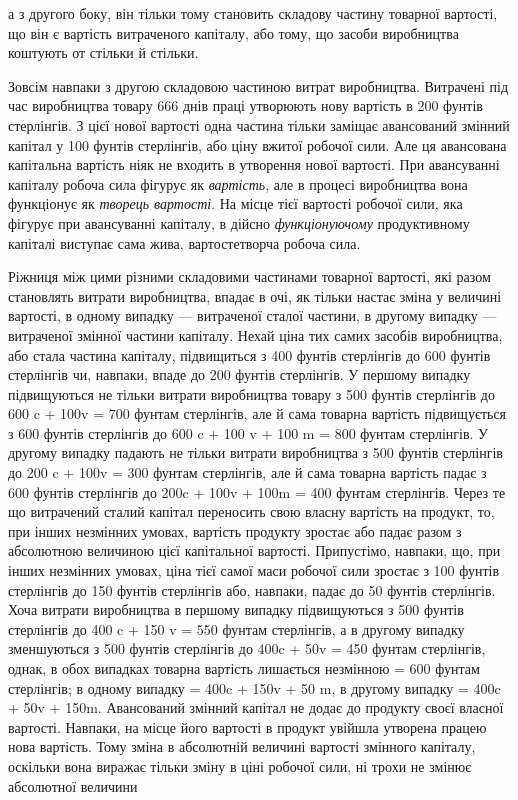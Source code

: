 \parcont{}  %
а з другого боку, він тільки тому становить складову частину
товарної вартості, що він є вартість витраченого капіталу, або
тому, що засоби виробництва коштують от стільки й стільки.

Зовсім навпаки з другою складовою частиною витрат виробництва.
Витрачені під час виробництва товару 666 днів
праці утворюють нову вартість в 200 фунтів стерлінгів. З цієї
нової вартості одна частина тільки заміщає авансований змінний
капітал у 100 фунтів стерлінгів, або ціну вжитої робочої сили.
Але ця авансована капітальна вартість ніяк не входить в утворення
нової вартості. При авансуванні капіталу робоча сила
фігурує як \emph{вартість}, але в процесі виробництва вона функціонує
як \emph{творець вартості}. На місце тієї вартості робочої сили,
яка фігурує при авансуванні капіталу, в дійсно \emph{функціонуючому}
продуктивному капіталі виступає сама жива, вартостетворча робоча
сила.

Ріжниця між цими різними складовими частинами товарної
вартості, які разом становлять витрати виробництва, впадає
в очі, як тільки настає зміна у величині вартості, в одному випадку
— витраченої сталої частини, в другому випадку — витраченої
змінної частини капіталу. Нехай ціна тих самих засобів виробництва,
або стала частина капіталу, підвищиться з 400 фунтів
стерлінгів до 600 фунтів стерлінгів чи, навпаки, впаде до
200 фунтів стерлінгів. У першому випадку підвищуються не
тільки витрати виробництва товару з 500 фунтів стерлінгів до
600 c + 100v = 700 фунтам стерлінгів, але й сама товарна вартість
підвищується з 600 фунтів стерлінгів до 600 c + 100 v + 100 m =
800 фунтам стерлінгів. У другому випадку падають не тільки
витрати виробництва з 500 фунтів стерлінгів до 200 c + 100v =
300 фунтам стерлінгів, але й сама товарна вартість падає з
600 фунтів стерлінгів до 200c + 100v + 100m = 400 фунтам стерлінгів.
Через те що витрачений сталий капітал переносить свою
власну вартість на продукт, то, при інших незмінних умовах, вартість
продукту зростає або падає разом з абсолютною величиною
цієї капітальної вартості. Припустімо, навпаки, що, при
інших незмінних умовах, ціна тієї самої маси робочої сили зростає
з 100 фунтів стерлінгів до 150 фунтів стерлінгів або,
навпаки, падає до 50 фунтів стерлінгів. Хоча витрати виробництва
в першому випадку підвищуються з 500 фунтів стерлінгів
до 400 c + 150 v = 550 фунтам стерлінгів, а в другому випадку
зменшуються з 500 фунтів стерлінгів до 400c + 50v = 450 фунтам
стерлінгів, однак, в обох випадках товарна вартість лишається
незмінною = 600 фунтам стерлінгів; в одному випадку
= 400c + 150v + 50 m, в другому випадку = 400c + 50v + 150m.
Авансований змінний капітал не додає до продукту своєї власної
вартості. Навпаки, на місце його вартості в продукт увійшла утворена
працею нова вартість. Тому зміна в абсолютній величині
вартості змінного капіталу, оскільки вона виражає тільки зміну
в ціні робочої сили, ні трохи не змінює абсолютної величини
\parbreak{}  %
